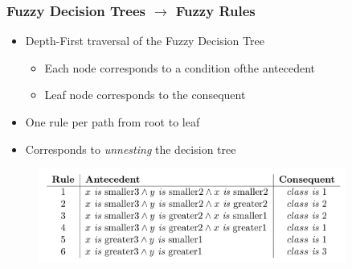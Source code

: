 \documentclass[
	10pt,
	t		%
]{beamer}
\begin{document}
\begin{frame}

	\frametitle{Fuzzy Decision Trees $\rightarrow$ Fuzzy Rules}

	\begin{itemize}
		\item Depth-First traversal of the Fuzzy Decision Tree
		      \begin{itemize}
			      \item Each node corresponds to a condition ofthe antecedent
			      \item Leaf node corresponds to the consequent
		      \end{itemize}
		\item One rule per path from root to leaf
		\item Corresponds to \textit{unnesting} the decision tree
	\end{itemize}

	\begin{figure}
		\centering
		\includegraphics[width=0.9\textwidth]{figures/extracted-rules.png}
	\end{figure}

\end{frame}
\end{document}
